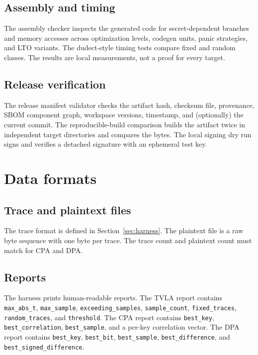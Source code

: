 \documentclass[11pt,a4paper]{article}
\newcommand{\code}[1]{\texttt{#1}}
\theoremstyle{plain}
\theoremstyle{definition}
\theoremstyle{remark}
\begin{document}
\subsection{Assembly and timing}

The assembly checker inspects the generated code for secret-dependent branches and
memory accesses across optimization levels, codegen units, panic strategies, and LTO
variants. The dudect-style timing tests \citep{reparaz2017dudect} compare fixed and
random classes. The results are local measurements, not a proof for every target.

\subsection{Release verification}

The release manifest validator checks the artifact hash, checksum file, provenance,
SBOM component graph, workspace versions, timestamp, and (optionally) the current
commit. The reproducible-build comparison builds the artifact twice in independent
target directories and compares the bytes. The local signing dry run signs and verifies
a detached signature with an ephemeral test key.

\section{Data formats}\label{sec:formats}

\subsection{Trace and plaintext files}

The trace format is defined in Section~\ref{sec:harness}. The plaintext file is a raw
byte sequence with one byte per trace. The trace count and plaintext count must match
for CPA and DPA.

\subsection{Reports}

The harness prints human-readable reports. The TVLA report contains \code{max\_abs\_t},
\code{max\_sample}, \code{exceeding\_samples}, \code{sample\_count},
\code{fixed\_traces}, \code{random\_traces}, and \code{threshold}. The CPA report
contains \code{best\_key}, \code{best\_correlation}, \code{best\_sample}, and a
per-key correlation vector. The DPA report contains \code{best\_key}, \code{best\_bit},
\code{best\_sample}, \code{best\_difference}, and \code{best\_signed\_difference}.
\end{document}

